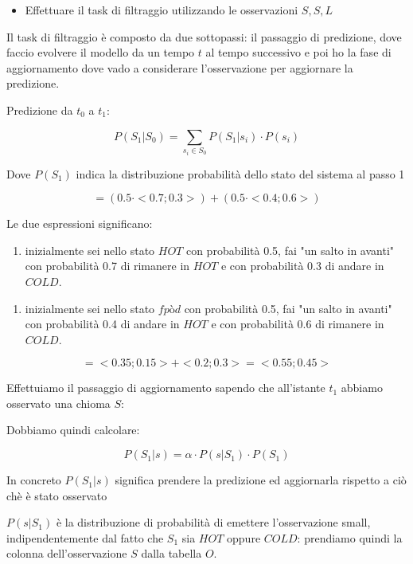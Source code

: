 \documentclass{article}
\begin{document}
\begin{itemize}
	\item Effettuare il task di filtraggio utilizzando le osservazioni ${S, S, L}$
\end{itemize}


\begin{mdframed}[hidealllines=true,backgroundcolor=blue!20]
	Il task di filtraggio è composto da due sottopassi: il passaggio di predizione, dove faccio evolvere il modello da un tempo $t$ al tempo successivo e poi ho la fase di aggiornamento dove vado a considerare l'osservazione per aggiornare la predizione.
\end{mdframed} 

Predizione da $t_0$ a $t_1$:

\[
	P(S_1 | S_0) = \sum_{s_i \in S_0} P(S_1 | s_i) \cdot P(s_i)
\]

Dove $P(S_1)$ indica la distribuzione probabilità dello stato del sistema al passo 1

\[
 = (0.5 \cdot <0.7 ; 0.3> ) + (0.5 \cdot <0.4 ; 0.6> )
\]

Le due espressioni significano:
\begin{enumerate}
	\item  inizialmente sei nello stato $HOT$ con probabilità 0.5, fai "un salto in avanti" con probabilità 0.7 di rimanere in $HOT$ e con probabilità 0.3 di andare in $COLD$.
\end{enumerate}

\begin{enumerate}
	\item  inizialmente sei nello stato $fpòd$ con probabilità 0.5, fai "un salto in avanti" con probabilità 0.4 di andare in $HOT$ e con probabilità 0.6 di rimanere in $COLD$.
\end{enumerate}


\[
= <0.35 ; 0.15>  + <0.2 ; 0.3> = <0.55 ; 0.45>
\]

Effettuiamo il passaggio di aggiornamento sapendo che all'istante $t_1$ abbiamo osservato una chioma $S$:

Dobbiamo quindi calcolare:

\[
P(S_1 | s) = \alpha \cdot P(s | S_1) \cdot P(S_1)
\]

In concreto $P(S_1 | s)$ significa prendere la predizione ed aggiornarla rispetto a ciò chè è stato osservato

$P(s | S_1)$ è la distribuzione di probabilità di emettere l'osservazione small, indipendentemente dal fatto che $S_1$ sia $HOT$ oppure $COLD$: prendiamo quindi la colonna dell'osservazione $S$ dalla tabella $O$.
\end{document}
